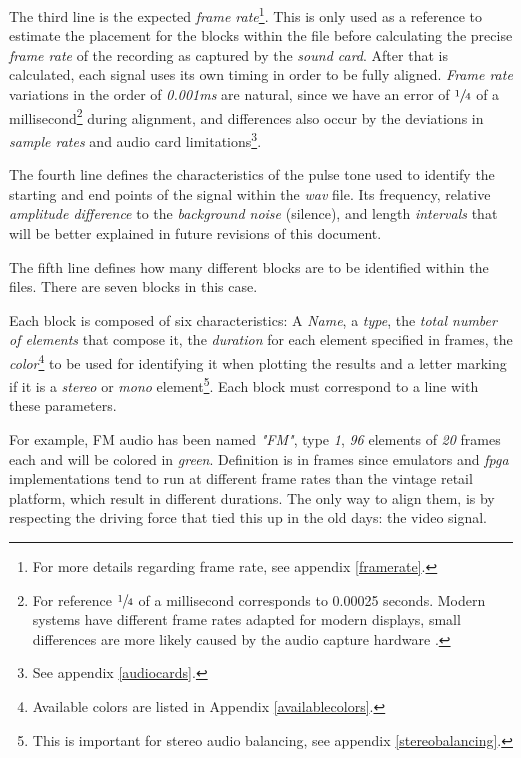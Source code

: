 \documentclass[10pt,a4paper]{report}
\newcommand{\ac}[1]{\textit{\acrshort{#1}}}
\begin{document}
\begin{appendices}
The third line is the expected \textit{frame rate}\footnote{For more details regarding frame rate, see appendix \ref{framerate}.}. This is only used as a reference to estimate the placement for the blocks within the file before calculating the precise \textit{frame rate} of the recording as captured by the \textit{sound card}. After that is calculated, each signal uses its own timing in order to be fully aligned. \textit{Frame rate} variations in the order of \textit{0.001}\ac{ms} are natural, since we have an error of $\sfrac{1}{4}$ of a millisecond\footnote{For reference $\sfrac{1}{4}$ of a millisecond corresponds to 0.00025 seconds. Modern systems have different frame rates adapted for modern displays, small differences are more likely caused by the audio capture hardware \cite{SoundCardClock}.} during alignment, and differences also occur by the deviations in \textit{sample rates} and audio card limitations\footnote{See appendix \ref{audiocards}.}.

The fourth line defines the characteristics of the pulse tone used to identify the starting and end points of the signal within the \ac{wav} file. Its frequency, relative \textit{amplitude difference} to the \textit{background noise} (silence), and length \textit{intervals} that will be better explained in future revisions of this document.

The fifth line defines how many different blocks are to be identified within the files. There are seven blocks in this case.

Each block is composed of six characteristics: A \textit{Name}, a \textit{type}, the \textit{total number of elements} that compose it, the \textit{duration} for each element specified in frames, the \textit{color}\footnote{Available colors are listed in Appendix \ref{availablecolors}.} to be used for identifying it when plotting the results and a letter marking if it is a \textit{stereo} or \textit{mono} element\footnote{This is important for stereo audio balancing, see appendix \ref{stereobalancing}.}. Each block must correspond to a line with these parameters.

For example, FM audio has been named \textit{"FM"}, type \textit{1}, \textit{96} elements of \textit{20} frames each and will be colored in \textit{green}. Definition is in frames since emulators and \ac{fpga} implementations tend to run at different frame rates than the vintage retail platform, which result in different durations. The only way to align them, is by respecting the driving force that tied this up in the old days: the video signal.


\end{appendices}
\end{document}
